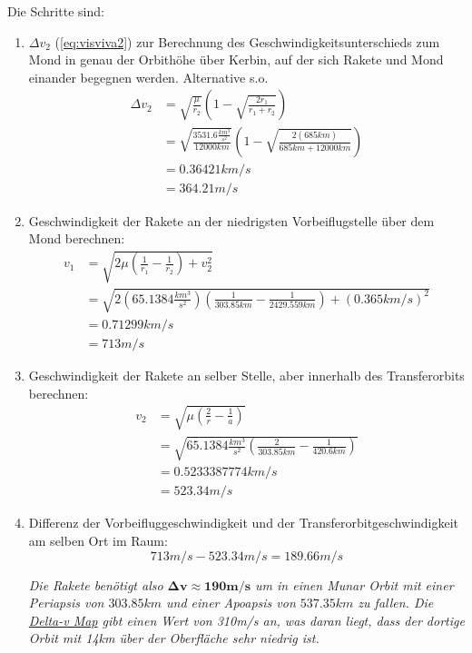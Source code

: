 \documentclass[12pt,paper=A4,numbers=noenddot,bibliography=totoc,listof=totoc,DIV=11,BCOR=1mm]{scrreprt}
\begin{document}
\begin{enumerate}
Die Schritte sind:\
	\begin{enumerate}
	\item $\Delta v_{2}$ (\ref{eq:visviva2}) zur Berechnung des Geschwindigkeitsunterschieds zum Mond in genau der Orbithöhe über Kerbin, auf der sich Rakete und Mond einander begegnen werden. Alternative s.o.
	\begin{equation*}
	\begin{split}
	\Delta v_{2} &= \sqrt{\frac{\mu}{r_{2}}} \left( 1-\sqrt{\frac{2r_{1}}{r_{1}+r_{2}}} \right) \\
	             &= \sqrt{\frac{3531.6 \frac{km^{3}}{s^{2}}}{12000km}} \left( 1-\sqrt{\frac{2(685km)}{685km+12000km}} \right) \\
	             &= 0.36421 km/s \\
	             &= 364.21 m/s
	\end{split}
	\end{equation*}
	\item Geschwindigkeit der Rakete an der niedrigsten Vorbeiflugstelle über dem Mond berechnen:
	\begin{equation}
	\begin{split}
	v_{1} &= \sqrt{2\mu \left( \frac{1}{r_{1}} - \frac{1}{r_{2}} \right) + v_{2}^{2} }\\
	      &= \sqrt{2(65.1384 \frac{km^{3}}{s^{2}}) \left( \frac{1}{303.85km} - \frac{1}{2429.559km} \right) + (0.365km/s)^{2} }\\
	      &= 0.71299 km/s \\
	      &= 713 m/s
	\end{split}
	\end{equation}
	\item Geschwindigkeit der Rakete an selber Stelle, aber innerhalb des Transferorbits berechnen:
	\begin{equation*}
	\begin{split}
	v_{2} &= \sqrt{\mu \left( \frac{2}{r} - \frac{1}{a} \right) } \\
	      &= \sqrt{65.1384 \frac{km^{3}}{s^{2}} \left( \frac{2}{303.85km} - \frac{1}{420.6km} \right) } \\
	      &= 0.5233387774 km/s \\
	      &= 523.34 m/s
	\end{split}
	\end{equation*}
	\item Differenz der Vorbeifluggeschwindigkeit und der Transferorbitgeschwindigkeit am selben Ort im Raum:
	$$
	713 m/s - 523.34 m/s = 189.66 m/s
	$$
	
	\emph{Die Rakete benötigt also $\mathbf{\Delta v \approx 190 m/s}$ um in einen Munar Orbit mit einer Periapsis von $303.85km$ und einer Apoapsis von $537.35km$ zu fallen. Die \href{https://wiki.kerbalspaceprogram.com/wiki/File:KerbinDeltaVMap.png}{Delta-v Map} gibt einen Wert von 310m/s an, was daran liegt, dass der dortige Orbit mit 14km über der Oberfläche sehr niedrig ist.}
	\end{enumerate}
	
\end{enumerate}
\bigskip
\end{document}
